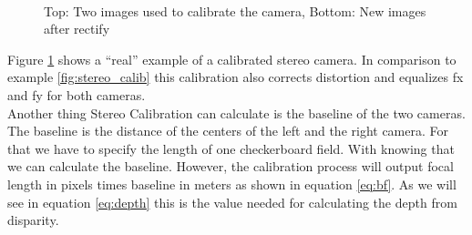\documentclass[11pt,a4paper,titlepage,oneside]{report}
\begin{document}
\begin{figure}[H]
	\centering
	\\
	\caption{Top: Two images used to calibrate the camera, Bottom: New images after rectify}\label{fig:calibration_real}
\end{figure}

Figure \ref{fig:calibration_real} shows a ``real'' example of a calibrated stereo camera. In comparison to example \ref{fig:stereo_calib} this calibration also corrects distortion and equalizes fx and fy for both cameras.\\

Another thing Stereo Calibration can calculate is the baseline of the two cameras. The baseline is the distance of the centers of the left and the right camera. For that we have to specify the length of one checkerboard field. With knowing that we can calculate the baseline. However, the calibration process will output focal length in pixels times baseline in meters as shown in equation \ref{eq:bf}. As we will see in equation \ref{eq:depth} this is the value needed for calculating the depth from disparity.
\end{document}
